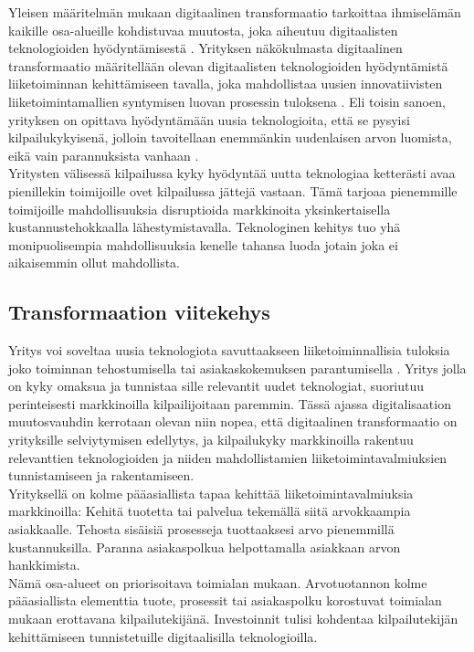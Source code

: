 \documentclass[finnish,12pt,a4paper,pdftex]{article}
\begin{document}
Yleisen määritelmän mukaan digitaalinen transformaatio tarkoittaa ihmiselämän kaikille osa-alueille kohdistuvaa muutosta, joka aiheutuu digitaalisten teknologioiden hyödyntämisestä \citep{leanit}. Yrityksen näkökulmasta digitaalinen transformaatio määritellään olevan digitaalisten teknologioiden hyödyntämistä liiketoiminnan kehittämiseen tavalla, joka mahdollistaa uusien innovatiivisten liiketoimintamallien syntymisen luovan prosessin tuloksena \citep{knobel}. Eli toisin sanoen, yrityksen on opittava hyödyntämään uusia teknologioita, että se pysyisi kilpailukykyisenä, jolloin tavoitellaan enemmänkin uudenlaisen arvon luomista, eikä vain parannuksista vanhaan \citep{susanmoore}. \\

\noindent Yritysten välisessä kilpailussa kyky hyödyntää uutta teknologiaa ketterästi avaa pienillekin toimijoille ovet kilpailussa jättejä vastaan. Tämä tarjoaa pienemmille toimijoille mahdollisuuksia disruptioida markkinoita yksinkertaisella kustannustehokkaalla lähestymistavalla. Teknologinen kehitys tuo yhä monipuolisempia mahdollisuuksia kenelle tahansa luoda jotain joka ei aikaisemmin ollut mahdollista. \citep{lamoureux}

\subsection{Transformaation viitekehys}

Yritys voi soveltaa uusia teknologiota savuttaakseen liiketoiminnallisia tuloksia joko toiminnan tehostumisella tai asiakaskokemuksen parantumisella \citep{ibmtrans}. Yritys jolla on kyky omaksua ja tunnistaa sille relevantit uudet teknologiat, suoriutuu perinteisesti markkinoilla kilpailijoitaan paremmin. Tässä ajassa digitalisaation muutosvauhdin kerrotaan olevan niin nopea, että digitaalinen transformaatio on yrityksille selviytymisen edellytys, ja kilpailukyky markkinoilla rakentuu relevanttien teknologioiden ja niiden mahdollistamien liiketoimintavalmiuksien tunnistamiseen ja rakentamiseen. \citep{lamoureux}\\

Yrityksellä on kolme pääasiallista tapaa kehittää liiketoimintavalmiuksia markkinoilla: Kehitä tuotetta tai palvelua tekemällä siitä arvokkaampia asiakkaalle. Tehosta sisäisiä prosesseja tuottaaksesi arvo pienemmillä kustannuksilla. Paranna asiakaspolkua helpottamalla asiakkaan arvon hankkimista. \citep{lamoureux}\\

\noindent Nämä osa-alueet on priorisoitava toimialan mukaan. Arvotuotannon kolme pääasiallista elementtia tuote, prosessit tai asiakaspolku korostuvat toimialan mukaan erottavana kilpailutekijänä. Investoinnit tulisi kohdentaa kilpailutekijän kehittämiseen tunnistetuille digitaalisilla teknologioilla. \citep{lamoureux}\\
\end{document}

